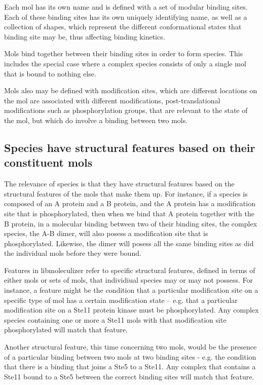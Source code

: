 Each mol has its own name and is defined with a set of modular binding
sites.  Each of these binding sites has its own uniquely identifying
name, as well as a collection of shapes, which represent the different
conformational states that binding site may be, thus affecting binding
kinetics.  

Mols bind together between their binding sites in order to form
species.  This includes the special case where a complex species
consists of only a single mol that is bound to nothing else.

Mols also may be defined with modification sites, which are different
locations on the mol are associated with different modifications,
post-translational modifications such as phosphorylation groups, that
are relevant to the state of the mol, but which do involve a binding
between two mols.  

\subsection{Species have structural features based on their
 constituent mols}

The relevance of species is that they have structural features based
on the structural features of the mols that make them up.  For
instance, if a species is composed of an A protein and a B protein,
and the A protein has a modification site that is phosphorylated, then
when we bind that A protein together with the B protein, in a
molecular binding between two of their binding sites, the complex
species, the A-B dimer, will also posess a modification site that is
phosphorylated. Likewise, the dimer will posess all the same binding
sites as did the individual mols before they were bound.

Features in libmoleculizer refer to specific structural features,
defined in terms of either mols or sets of mols, that individiual
species may or may not possess. For instance, a feature might be the
condition that a particular modification site on a specific type of
mol has a certain modification state -- e.g. that a particular
modification site on a Ste11 protein kinase must be
phosphorylated. Any complex species containing one or more a Ste11
mols with that modification site phosphorylated will match that
feature.

Another structural feature, this time concerning two mols, would be
the presence of a particular binding between two mols at two binding
sites - e.g. the condition that there is a binding that joins a Ste5
to a Ste11. Any complex that contains a Ste11 bound to a Ste5 between
the correct binding sites will match that feature.

